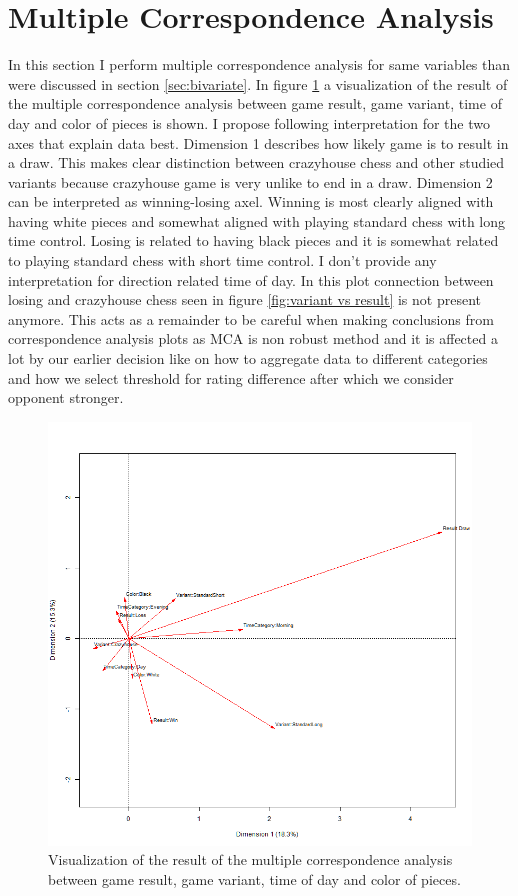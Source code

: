 \section{Multiple Correspondence Analysis}
\label{sec:multivariate}

In this section I perform multiple correspondence analysis for same variables than were discussed in section \ref{sec:bivariate}. In figure \ref{fig:mca} a visualization of the result of the multiple correspondence analysis between game result, game variant, time of day and color of pieces is shown. I propose following interpretation for the two axes that explain data best. Dimension 1 describes how likely game is to result in a draw. This makes clear distinction between crazyhouse chess and other studied variants because crazyhouse game is very unlike to end in a draw. Dimension 2 can be interpreted as winning-losing axel. Winning is most clearly aligned with having white pieces and somewhat aligned with playing standard chess with long time control. Losing is related to having black pieces and it is somewhat related to playing standard chess with short time control. I don't provide any interpretation for direction related time of day. In this plot connection between losing and crazyhouse chess seen in figure \ref{fig:variant vs result} is not present anymore. This acts as a remainder to be careful when making conclusions from correspondence analysis plots as MCA is non robust method and it is affected a lot by our earlier decision like on how to aggregate data to different categories and how we select threshold for rating difference after which we consider opponent stronger.

\begin{figure}[ht!]
    \includegraphics[width=\textwidth]{../img/mca.png}
    \caption{Visualization of the result of the multiple correspondence analysis between game result, game variant, time of day and color of pieces.}
    \label{fig:mca}
\end{figure}